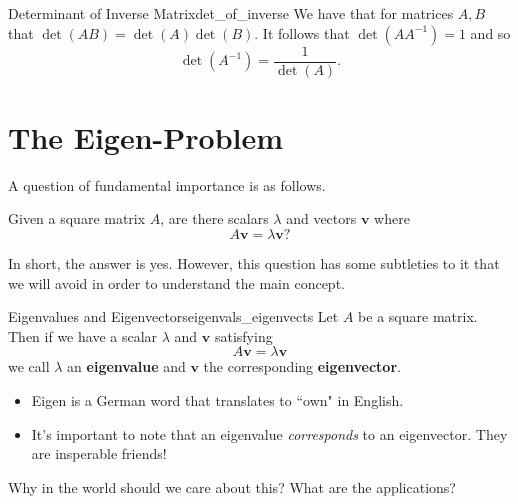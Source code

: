         \begin{prop}{Determinant of Inverse Matrix}{det_of_inverse}
        We have that for matrices $A,B$ that $\det(AB)=\det(A)\det(B)$.  It follows that 
        $\det(AA^{-1})=1$ and so 
        \[
        \det(A^{-1})=\frac{1}{\det(A)}.
        \]
        \end{prop}
    
        
   \section{The Eigen-Problem}
        A question of fundamental importance is as follows. 
        \begin{question}
        Given a square matrix $A$, are there scalars $\lambda$ and vectors $\mathbf{v}$ where
        \[
        A\mathbf{v}=\lambda \mathbf{v}?
        \]
        \end{question}
        
        \begin{answer}
        In short, the answer is yes.  However, this question has some subtleties to it that we will avoid in order to understand the main concept.
        \end{answer}
        
        \begin{df}{Eigenvalues and Eigenvectors}{eigenvals_eigenvects}
        Let $A$ be a square matrix.  Then if we have a scalar $\lambda$ and $\mathbf{v}$ satisfying
        \[
        A\mathbf{v}=\lambda \mathbf{v}
        \]
        we call $\lambda$ an \textbf{eigenvalue}  and $\mathbf{v}$ the corresponding \textbf{eigenvector}.
        \end{df}
        
        \begin{remark}
        \begin{itemize}
            \item Eigen is a German word that translates to ``own" in English.
            \item It's important to note that an eigenvalue \emph{corresponds} to an eigenvector.  They are insperable friends! 
        \end{itemize}
        \end{remark}
        
        \begin{question}
        Why in the world should we care about this? What are the applications? 
        \end{question}
        
